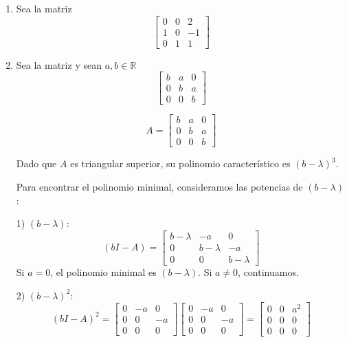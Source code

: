 \documentclass{report}
\begin{document}
\begin{enumerate}
\begin{enumerate}
            \item Sea la matriz $$\begin{bmatrix}
                0 & 0 & 2\\
                1 & 0 & -1\\
                0 & 1 & 1
            \end{bmatrix}$$

            \item Sea la matriz y sean $a, b \in \mathbb{R}$
            $$\begin{bmatrix}
                b & a & 0\\
                0 & b & a\\
                0 & 0 & b
            \end{bmatrix}$$

            \[
                A = \begin{bmatrix}
                b & a & 0 \\
                0 & b & a \\
                0 & 0 & b
                \end{bmatrix}
                \]
                
                Dado que $A$ es triangular superior, su polinomio característico es $(b-\lambda)^3$.
                
                Para encontrar el polinomio minimal, consideramos las potencias de $(b-\lambda)$:
                
                1) $(b-\lambda)$:
                \[
                (bI - A) = \begin{bmatrix}
                b-\lambda & -a & 0 \\
                0 & b-\lambda & -a \\
                0 & 0 & b-\lambda
                \end{bmatrix}
                \]
                Si $a=0$, el polinomio minimal es $(b-\lambda)$. Si $a\neq0$, continuamos.
                
                2) $(b-\lambda)^2$:
                \[
                (bI - A)^2 = \begin{bmatrix}
                0 & -a & 0 \\
                0 & 0 & -a \\
                0 & 0 & 0
                \end{bmatrix} \begin{bmatrix}
                0 & -a & 0 \\
                0 & 0 & -a \\
                0 & 0 & 0
                \end{bmatrix} = \begin{bmatrix}
                0 & 0 & a^2 \\
                0 & 0 & 0 \\
                0 & 0 & 0
                \end{bmatrix}
                \]
                

\end{enumerate}
\end{enumerate}
\end{document}
